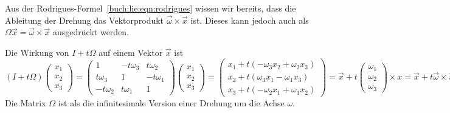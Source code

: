 Aus der Rodrigues-Formel~\ref{buch:lie:eqn:rodrigues} wissen wir
bereits, dass die Ableitung der Drehung das Vektorprodukt
$\vec{\omega}\times\vec{x}$ ist.
Dieses kann jedoch auch als
$\Omega\vec{x} = \vec{\omega}\times\vec{x}$
ausgedrückt werden.

Die Wirkung von $I+t\Omega$ auf einem Vektor $\vec{x}$ ist
\[
(I+t\Omega)
\begin{pmatrix}x_1\\x_2\\x_3\end{pmatrix}
=
\begin{pmatrix}
    1     &-t\omega_3& t\omega_2\\
 t\omega_3&   1      &-t\omega_1\\
-t\omega_2& t\omega_1&    1
\end{pmatrix}
\begin{pmatrix}x_1\\x_2\\x_3\end{pmatrix}
=
\begin{pmatrix}
x_1+t(-\omega_3x_2+\omega_2x_3)\\
x_2+t( \omega_3x_1-\omega_1x_3)\\
x_3+t(-\omega_2x_1+\omega_1x_2)
\end{pmatrix}
=
\vec{x}+ t\begin{pmatrix}\omega_1\\\omega_2\\\omega_3\end{pmatrix}\times x
=
\vec{x}+ t\vec{\omega}\times \vec{x}.
\]
Die Matrix $\Omega$ ist als die infinitesimale Version einer Drehung
um die Achse $\omega$.

